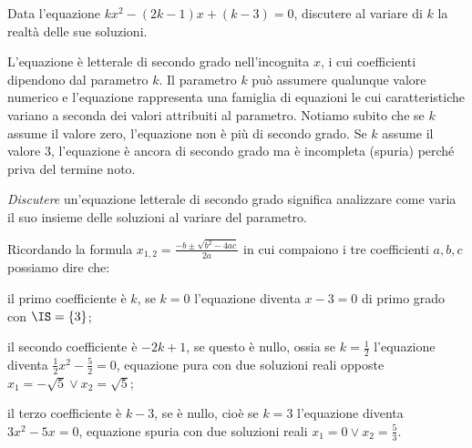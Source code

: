 \begin{exrig}
\begin{esempio}
Data l'equazione $k x^{2} - ( 2 k - 1 ) x + ( k - 3 ) = 0$, discutere al variare di $k$ la realtà delle sue soluzioni.

L’equazione è letterale di secondo grado nell’incognita $x$, i cui coefficienti dipendono dal parametro $k$. Il parametro $k$ può assumere qualunque valore numerico e l’equazione rappresenta una famiglia di equazioni le cui caratteristiche variano a seconda dei valori attribuiti al parametro. Notiamo subito che se
$k$ assume il valore zero, l’equazione non è più di secondo grado. Se $k$ assume il valore $3$, l’equazione è ancora di secondo grado ma è incompleta (spuria) perché priva del termine noto.

\emph{Discutere} un’equazione letterale di secondo grado significa analizzare come varia il suo insieme delle soluzioni al variare del parametro.

Ricordando la formula $x_{1,2}=\frac{- b \pm \sqrt{b^{2} - 4 a c}}{2 a}$ in cui compaiono i tre coefficienti $a, b, c$ possiamo dire che:
 \begin{itemize*}
 \item il primo coefficiente è $k$, se $k = 0$ l’equazione diventa $x - 3 = 0$ di primo grado con $\IS = \{3\}$;
 \item il secondo coefficiente è $-2k+1$, se questo è nullo, ossia se $k = \frac{1}{2}$ l’equazione diventa $\frac{1}{2} x^{2} - \frac{5}{2}=0$, equazione pura con due soluzioni reali opposte $x_{1} = - \sqrt{5} \vee x_{2} = \sqrt{5}$;
 \item il terzo coefficiente è $k-3$, se è nullo, cioè se $k = 3$ l’equazione diventa $3 x^{2} - 5 x = 0$, equazione spuria con due soluzioni reali $x_{1} = 0 \vee x_{2} = \frac{5}{3}$.
 \end{itemize*}


\end{esempio}
\end{exrig}
